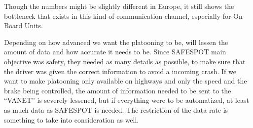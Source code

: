 Though the numbers might be slightly different in Europe, it still shows the bottleneck that exists in this kind of communication channel, especially for On Board Units.\par
% 
Depending on how advanced we want the platooning to be, will lessen the amount of data and how accurate it needs to be. Since SAFESPOT main objective was safety, they needed as many details as possible, to make sure that the driver was given the correct information to avoid a incoming crash. If we want to make platooning only available on highways and only the speed and the brake being controlled, the amount of information needed to be sent to the “VANET” is severely lessened, but if everything were to be automatized, at least as much data as SAFESPOT is needed. The restriction of the data rate is something to take into consideration as well. 